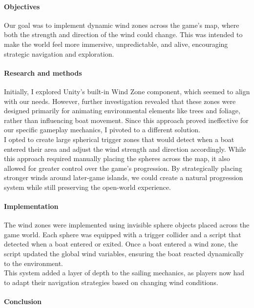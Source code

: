 \documentclass{article}
\begin{document}
\paragraph{Objectives}\hfill

Our goal was to implement dynamic wind zones across the game's map, where both the strength and direction of the wind could change. This was intended to make the world feel more immersive, unpredictable, and alive, encouraging strategic navigation and exploration.

\paragraph{Research and methods}\hfill

Initially, I explored Unity's built-in Wind Zone component, which seemed to align with our needs. However, further investigation revealed that these zones were designed primarily for animating environmental elements like trees and foliage, rather than influencing boat movement. Since this approach proved ineffective for our specific gameplay mechanics, I pivoted to a different solution.\\

I opted to create large spherical trigger zones that would detect when a boat entered their area and adjust the wind strength and direction accordingly. While this approach required manually placing the spheres across the map, it also allowed for greater control over the game's progression. By strategically placing stronger winds around later-game islands, we could create a natural progression system while still preserving the open-world experience.

\paragraph{Implementation}\hfill

The wind zones were implemented using invisible sphere objects placed across the game world. Each sphere was equipped with a trigger collider and a script that detected when a boat entered or exited. Once a boat entered a wind zone, the script updated the global wind variables, ensuring the boat reacted dynamically to the environment.\\

This system added a layer of depth to the sailing mechanics, as players now had to adapt their navigation strategies based on changing wind conditions.

\paragraph{Conclusion}\hfill
\end{document}
